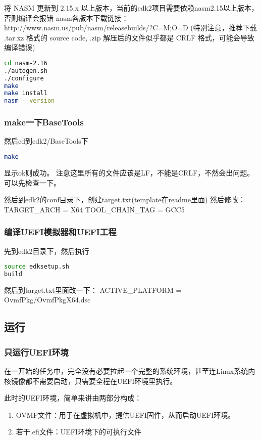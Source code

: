 将 NASM 更新到 2.15.x 以上版本，当前的edk2项目需要依赖nasm2.15以上版本，否则编译会报错
nasm各版本下载链接：http://www.nasm.us/pub/nasm/releasebuilds/?C=M;O=D
(特别注意，推荐下载 .tar.xz 格式的 source code, .zip 解压后的文件似乎都是 CRLF 格式，可能会导致编译错误)

\begin{lstlisting}[language=bash]
cd nasm-2.16
./autogen.sh
./configure
make
make install
nasm --version
\end{lstlisting}

\subsubsection{make一下BaseTools}

然后cd到edk2/BaseTools下
\begin{lstlisting}[language=bash]
make
\end{lstlisting}

显示ok则成功。
注意这里所有的文件应该是LF，不能是CRLF，不然会出问题。可以先检查一下。

然后到edk2的conf目录下，创建target.txt(template在readme里面)
然后修改：
TARGET\_ARCH           = X64
TOOL\_CHAIN\_TAG        = GCC5

\subsubsection{编译UEFI模拟器和UEFI工程}
先到edk2目录下，然后执行
\begin{lstlisting}[language=bash]
source edksetup.sh
build
\end{lstlisting}

然后到target.txt里面改一下：
ACTIVE\_PLATFORM       = OvmfPkg/OvmfPkgX64.dsc

\subsection{运行}

\label{run-edk2}

\subsubsection{只运行UEFI环境}
在一开始的任务中，完全没有必要拉起一个完整的系统环境，甚至连Linux系统内核镜像都不需要启动，只需要全程在UEFI环境里执行。

此时的UEFI环境，简单来讲由两部分构成：
\begin{enumerate}
	\item OVMF文件：用于在虚拟机中，提供UEFI固件，从而启动UEFI环境。
	\item 若干.efi文件：UEFI环境下的可执行文件
\end{enumerate}

